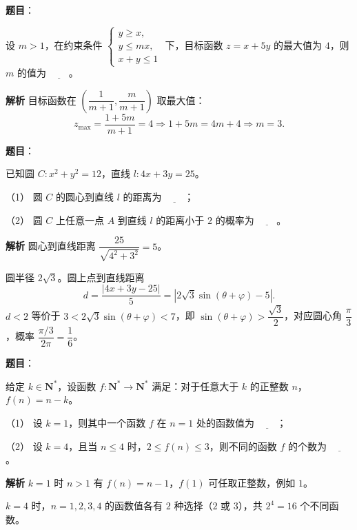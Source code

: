 \begin{answer}

\textbf{题目}：

设 $m>1$，在约束条件 $\begin{cases}y\geqslant x,\\y\leqslant mx,\\x+y\leqslant1\end{cases}$ 下，目标函数 $z=x+5y$ 的最大值为 $4$，则 $m$ 的值为 $\underline{\qquad}$。

\textbf{解析}
目标函数在 $\left(\dfrac1{m+1},\dfrac m{m+1}\right)$ 取最大值：
\nopagebreak[4]
\[z_{\max}=\frac{1+5m}{m+1}=4\Longrightarrow1+5m=4m+4\Longrightarrow m=3.\]


\end{answer}
\begin{answer}

\textbf{题目}：

已知圆 $C:x^2+y^2=12$，直线 $l:4x+3y=25$。

（1） 圆 $C$ 的圆心到直线 $l$ 的距离为 $\underline{\qquad}$；

（2） 圆 $C$ 上任意一点 $A$ 到直线 $l$ 的距离小于 $2$ 的概率为 $\underline{\qquad}$。

\textbf{解析}
圆心到直线距离 $\dfrac{25}{\sqrt{4^2+3^2}}=5$。

圆半径 $2\sqrt3$。圆上点到直线距离
\nopagebreak[4]
\[d=\frac{|4x+3y-25|}5=\left|2\sqrt3\sin(\theta+\varphi)-5\right|.\]
$d<2$ 等价于 $3<2\sqrt3\sin(\theta+\varphi)<7$，即 $\sin(\theta+\varphi)>\dfrac{\sqrt3}2$，对应圆心角 $\dfrac\pi3$，概率 $\dfrac{\pi/3}{2\pi}=\dfrac16$。



\end{answer}
\begin{answer}

\textbf{题目}：

给定 $k\in\mathbf N^*$，设函数 $f:\mathbf N^*\to\mathbf N^*$ 满足：对于任意大于 $k$ 的正整数 $n$，$f(n)=n-k$。

（1） 设 $k=1$，则其中一个函数 $f$ 在 $n=1$ 处的函数值为 $\underline{\qquad}$；

（2） 设 $k=4$，且当 $n\leqslant4$ 时，$2\leqslant f(n)\leqslant3$，则不同的函数 $f$ 的个数为 $\underline{\qquad}$。

\textbf{解析}
$k=1$ 时 $n>1$ 有 $f(n)=n-1$，$f(1)$ 可任取正整数，例如 $1$。

$k=4$ 时，$n=1,2,3,4$ 的函数值各有 $2$ 种选择（$2$ 或 $3$），共 $2^4=16$ 个不同函数。



\end{answer}
